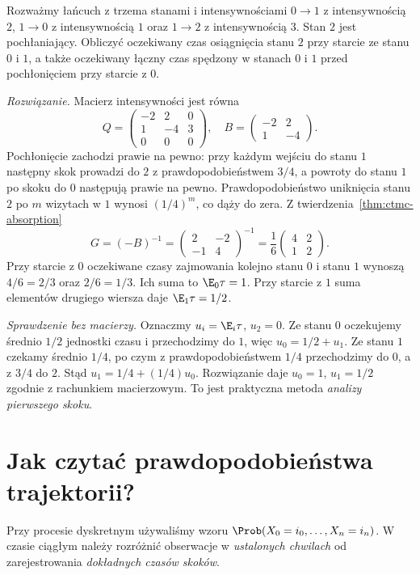 \begin{zadanie}
Rozważmy łańcuch z trzema stanami i intensywnościami
$0\to1$ z intensywnością $2$, $1\to0$ z intensywnością $1$
oraz $1\to2$ z intensywnością $3$.
Stan $2$ jest pochłaniający. Obliczyć oczekiwany czas
osiągnięcia stanu $2$ przy starcie ze stanu $0$ i $1$,
a także oczekiwany łączny czas spędzony w stanach $0$ i $1$
przed pochłonięciem przy starcie z $0$.

\emph{Rozwiązanie.} Macierz intensywności jest równa
\[
Q=\begin{pmatrix}-2&2&0\\1&-4&3\\0&0&0\end{pmatrix},
\quad
B=\begin{pmatrix}-2&2\\1&-4\end{pmatrix}.
\]
Pochłonięcie zachodzi prawie na pewno: przy każdym wejściu
do stanu $1$ następny skok prowadzi do $2$ z
prawdopodobieństwem $3/4$, a powroty do stanu $1$ po skoku
do $0$ następują prawie na pewno. Prawdopodobieństwo
uniknięcia stanu $2$ po $m$ wizytach w $1$ wynosi $(1/4)^m$,
co dąży do zera.
Z twierdzenia~\ref{thm:ctmc-absorption}
\[
G=(-B)^{-1}
=\begin{pmatrix}2&-2\\-1&4\end{pmatrix}^{-1}
=\frac16\begin{pmatrix}4&2\\1&2\end{pmatrix}.
\]
Przy starcie z $0$ oczekiwane czasy zajmowania kolejno
stanu $0$ i stanu $1$ wynoszą $4/6=2/3$ oraz $2/6=1/3$.
Ich suma to $\E_0\tau=1$. Przy starcie z $1$ suma
elementów drugiego wiersza daje $\E_1\tau=1/2$.

\emph{Sprawdzenie bez macierzy.} Oznaczmy
$u_i=\E_i\tau$, $u_2=0$.
Ze stanu $0$ oczekujemy średnio $1/2$ jednostki czasu
i przechodzimy do $1$, więc $u_0=1/2+u_1$.
Ze stanu $1$ czekamy średnio $1/4$, po czym z
prawdopodobieństwem $1/4$ przechodzimy do $0$,
a z $3/4$ do $2$. Stąd
$u_1=1/4+(1/4)u_0$. Rozwiązanie daje
$u_0=1$, $u_1=1/2$ zgodnie z rachunkiem macierzowym.
To jest praktyczna metoda \emph{analizy pierwszego skoku}.
\end{zadanie}

\section{Jak czytać prawdopodobieństwa trajektorii?}
Przy procesie dyskretnym używaliśmy wzoru
$\Prob(X_0=i_0,\ldots,X_n=i_n)$.
W czasie ciągłym należy rozróżnić obserwacje
w \emph{ustalonych chwilach} od zarejestrowania
\emph{dokładnych czasów skoków}.

